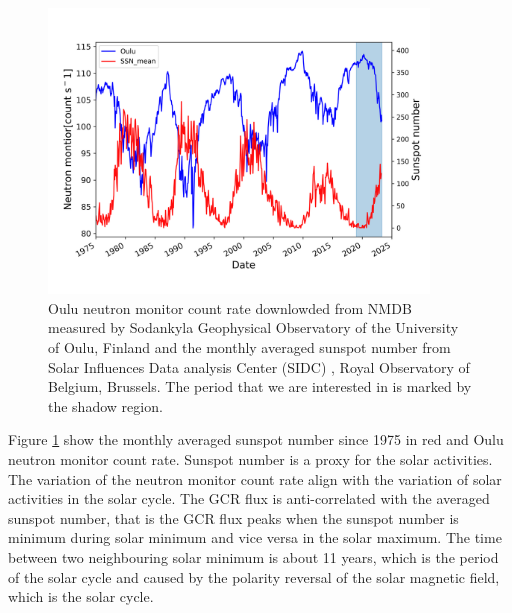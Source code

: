 \begin{figure}[htbp]
	\centering
	\includegraphics[width = 0.9\textwidth]{images/Solar_modulation.png}
	\caption[Sunspot number and Neutron monitor count data]{Oulu neutron monitor count rate downlowded from \ac{NMDB} \footnotemark[1] measured by Sodankyla Geophysical Observatory of the University of Oulu, Finland and the monthly averaged sunspot number from Solar Influences Data analysis Center (SIDC) \footnotemark[2], Royal Observatory of Belgium, Brussels. The period that we are interested in is marked by the shadow region.}
	\label{Fig:Solar_modulation}
\end{figure}


Figure \ref{Fig:Solar_modulation} show the monthly averaged sunspot number since 1975 in red and Oulu neutron monitor count rate.
Sunspot number is a proxy for the solar activities. The variation of the neutron monitor count rate align with the variation of solar activities in the solar cycle.
The GCR flux is anti-correlated with the averaged sunspot number, that is the GCR flux peaks when the sunspot number is minimum during solar minimum and vice versa in the solar maximum. The time between two neighbouring solar minimum is about 11 years, which is the period of the solar cycle and caused by the polarity reversal of the solar magnetic field, which is the solar cycle.

